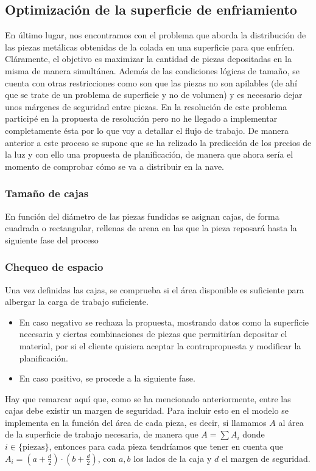 \subsection{Optimización de la superficie de enfriamiento}
%
%
En último lugar, nos encontramos con el problema que aborda la distribución de las piezas metálicas obtenidas de la colada en una superficie para que enfríen. Cláramente, el objetivo es maximizar la cantidad de piezas depositadas en la misma de manera simultánea. Además de las condiciones lógicas de tamaño, se cuenta con otras restricciones como son que las piezas no son apilables (de ahí que se trate de un problema de superficie y no de volumen) y es necesario dejar unos márgenes de seguridad entre piezas. En la resolución de este problema participé en la propuesta de resolución pero no he llegado a implementar completamente ésta por lo que voy a detallar el flujo de trabajo. De manera anterior a este proceso se supone que se ha relizado la predicción de los precios de la luz y con ello una propuesta de planificación, de manera que ahora sería el momento de comprobar cómo se va a distribuir en la nave.
\subsubsection{Tamaño de cajas}
     En función del diámetro de las piezas fundidas se asignan cajas, de forma cuadrada o rectangular, rellenas de arena en las que la pieza reposará hasta la siguiente fase del proceso
\subsubsection{Chequeo de espacio} Una vez definidas las cajas, se comprueba si el área disponible es suficiente para albergar la carga de trabajo suficiente.
\begin{itemize}
    \item En caso negativo se rechaza la propuesta, mostrando datos como la superficie necesaria y ciertas combinaciones de piezas que permitirían depositar el material, por si el cliente quisiera aceptar la contrapropuesta y modificar la planificación.
    \item En caso positivo, se procede a la siguiente fase.
   \end{itemize}
Hay que remarcar aquí que, como se ha mencionado anteriormente, entre las cajas debe existir un margen de seguridad. Para incluir esto en el modelo se implementa en la función del área de cada pieza, es decir, si llamamos $A$ al área de la superficie de trabajo necesaria, de manera que $A = \sum A_i$ donde $i \in \{\text{piezas}\}$, entonces para cada pieza tendríamos que tener en cuenta que $A_i = (a+\frac{d}{2})\cdot(b+\frac{d}{2})$, con $a,b$ los lados de la caja y $d$ el margen de seguridad.
